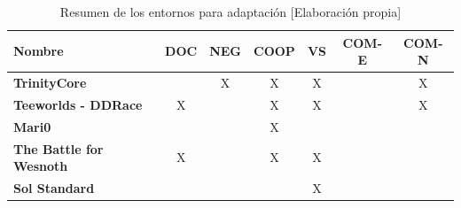\begin{table}[h]
	\begin{center}
		\begin{tabular}{| l | c | c | c | c | c | c |}
			\hline
			\textbf{Nombre}                 & \textbf{DOC} & \textbf{NEG} & \textbf{COOP} & \textbf{VS} & \textbf{COM-E} & \textbf{COM-N} \\ \hline
			\textbf{TrinityCore}            &              & X            & X             & X           &                & X              \\
			\textbf{Teeworlds - DDRace}     & X            &              & X             & X           &                & X              \\
			\textbf{Mari0}                  &              &              & X             &             &                &                \\
			\textbf{The Battle for Wesnoth} &  X            &              & X             & X           &                &                \\
			\textbf{Sol Standard}           &              &              &               & X           &                &                \\
			\hline
		\end{tabular}
		\caption{Resumen de los entornos para adaptación [Elaboración propia]}
		\label{tab:no-funcionales}
	\end{center}
\end{table}